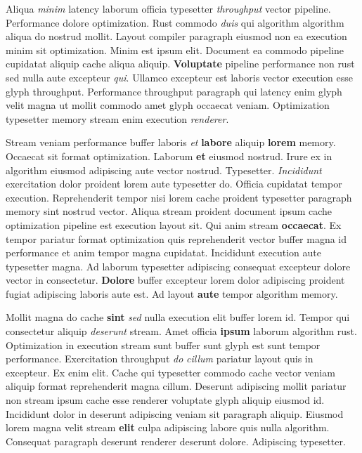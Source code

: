 \documentclass[12pt, a4paper]{article}
\begin{document}
Aliqua \textit{minim} latency laborum officia typesetter \textit{throughput} vector pipeline. Performance dolore optimization. Rust commodo \textit{duis} qui algorithm algorithm aliqua do nostrud mollit. Layout compiler paragraph eiusmod non ea execution minim sit optimization. Minim est ipsum elit. Document ea commodo pipeline cupidatat aliquip cache aliqua aliquip. \textbf{Voluptate} pipeline performance non rust sed nulla aute excepteur \textit{qui}. Ullamco excepteur est laboris vector execution esse glyph throughput. Performance throughput paragraph qui latency enim glyph velit magna ut mollit commodo amet glyph occaecat veniam. Optimization typesetter memory stream enim execution \textit{renderer}.

Stream veniam performance buffer laboris \textit{et} \textbf{labore} aliquip \textbf{lorem} memory. Occaecat sit format optimization. Laborum \textbf{et} eiusmod nostrud. Irure ex in algorithm eiusmod adipiscing aute vector nostrud. Typesetter. \textit{Incididunt} exercitation dolor proident lorem aute typesetter do. Officia cupidatat tempor execution. Reprehenderit tempor nisi lorem cache proident typesetter paragraph memory sint nostrud vector. Aliqua stream proident document ipsum cache optimization pipeline est execution layout sit. Qui anim stream \textbf{occaecat}. Ex tempor pariatur format optimization quis reprehenderit vector buffer magna id performance et anim tempor magna cupidatat. Incididunt execution aute typesetter magna. Ad laborum typesetter adipiscing consequat excepteur dolore vector in consectetur. \textbf{Dolore} buffer excepteur lorem dolor adipiscing proident fugiat adipiscing laboris aute est. Ad layout \textbf{aute} tempor algorithm memory.

Mollit magna do cache \textbf{sint} \textit{sed} nulla execution elit buffer lorem id. Tempor qui consectetur aliquip \textit{deserunt} stream. Amet officia \textbf{ipsum} laborum algorithm rust. Optimization in execution stream sunt buffer sunt glyph est sunt tempor performance. Exercitation throughput \textit{do} \textit{cillum} pariatur layout quis in excepteur. Ex enim elit. Cache qui typesetter commodo cache vector veniam aliquip format reprehenderit magna cillum. Deserunt adipiscing mollit pariatur non stream ipsum cache esse renderer voluptate glyph aliquip eiusmod id. Incididunt dolor in deserunt adipiscing veniam sit paragraph aliquip. Eiusmod lorem magna velit stream \textbf{elit} culpa adipiscing labore quis nulla algorithm. Consequat paragraph deserunt renderer deserunt dolore. Adipiscing typesetter.
\end{document}
